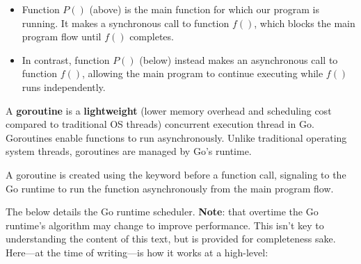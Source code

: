 \noindent
\begin{itemize}
\item Function $P()$ (above) is the main function for which our program is running. It makes a synchronous call to function $f()$, which blocks the main program flow until $f()$ completes.
\item In contrast, function $P()$ (below) instead makes an asynchronous call to function $f()$, allowing the main program to continue executing while $f()$ runs independently.
\end{itemize}

\noindent
\begin{Def}

    A \textbf{goroutine} is a \textbf{lightweight} (lower memory overhead and scheduling cost compared to traditional OS threads)
    concurrent execution thread in Go. Goroutines enable functions to run asynchronously. Unlike traditional operating system threads, goroutines are managed by Go's runtime.
    
    A goroutine is created using the  keyword before a function call, signaling to the Go runtime to run the function asynchronously from the main program flow.
    
\end{Def}

\newpage 

\noindent
The below details the Go runtime scheduler. \textbf{Note}: that overtime the Go runtime's algorithm may change to improve 
performance. This isn't key to understanding the content of this text, but is provided for completeness sake. Here---at the time of writing---is how it works at a high-level:


